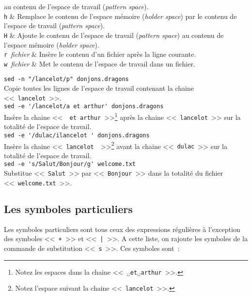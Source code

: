 \begin{tabular}
			au contenu de l'espace de travail ({\sl pattern space}).\\[1ex]
		{\tt h}			&
			Remplace le contenu de l'espace m{\'e}moire ({\sl holder space})
			par le contenu de l'espace de travail ({\sl pattern space}).\\[1ex]
		{\tt H}			&
			Ajoute le contenu de l'espace de travail ({\sl pattern space})
			au contenu de l'espace m{\'e}moire ({\sl holder space}).	\\[1ex]
		\verb*=r ={\it fichier}	&
			Ins{\`e}re le contenu d'un fichier apr{\`e}s la ligne courante.	\\[1ex]
		\verb*=w ={\it fichier}	&
			Met le contenu de l'espace de travail dans un fichier.	\\
	\hline
\end{tabular}

\begin{example}
\verb*=sed -n "/lancelot/p" donjons.dragons=\\[0.5cm]
Copie toutes les lignes de l'espace de travail contenant la chaine
<<~{\tt lancelot}~>>.\\[0.5cm]

\verb*=sed -e '/lancelot/a et arthur' donjons.dragons=\\[0.5cm]
Ins{\`e}re la chaine <<~\verb*= et arthur=~>>\footnote{Notez les espaces
dans la chaine <<~{\tt $_\sqcup$et$_\sqcup$arthur}~>>.} apr{\`e}s la chaine
<<~{\tt lancelot}~>> sur la totalit{\'e} de l'espace de travail.\\[0.5cm]

\verb*=sed -e '/dulac/ilancelot ' donjons.dragons=\\[0.5cm]
Ins{\`e}re la chaine <<~\verb*=lancelot =~>>\footnote{Notez l'espace
suivant la chaine <<~{\tt lancelot}~>>.} avant la chaine <<~{\tt dulac}~>>
sur la totalit{\'e} de l'espace de travail.\\[0.5cm]

\verb*=sed -e 's/Salut/Bonjour/g' welcome.txt=\\[0.5cm]
Substitue <<~{\tt Salut}~>> par <<~{\tt Bonjour}~>> dans la totalit{\'e}
du fichier <<~{\tt welcome.txt}~>>.
\end{example}


\subsection{Les symboles particuliers}

Les symboles particuliers sont tous ceux des expressions r{\'e}guli{\`e}res {\`a} l'exception des symboles <<~{\tt +}~>> et <<~{\tt |}~>>. A cette liste, on rajoute les symboles de la commande de substitution <<~{\tt s}~>>.
Ces symboles sont~:

